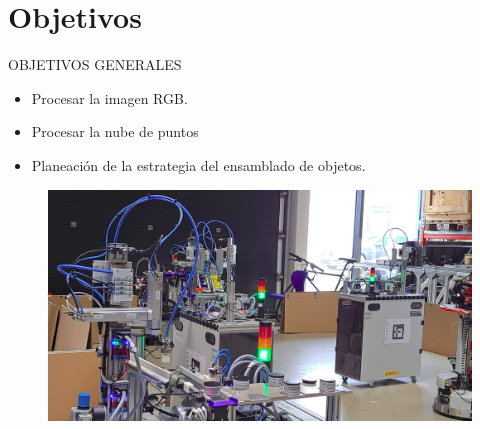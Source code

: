 \documentclass[handout,t]{beamer}
\begin{document}


\section{Objetivos}
\begin{frame}{OBJETIVOS GENERALES}
\phantom{sd}\\
\begin{itemize}
    \item Procesar la imagen RGB.
    \item Procesar la nube de puntos  
    \item Planeación de la estrategia del ensamblado de objetos.
\end{itemize}
\begin{figure}[htp]
    \includegraphics[scale=0.2]{NewerFigures/mps+arena.png}
    \label{fig:LogisticsArena}
\end{figure}
\end{frame}

\end{document}
